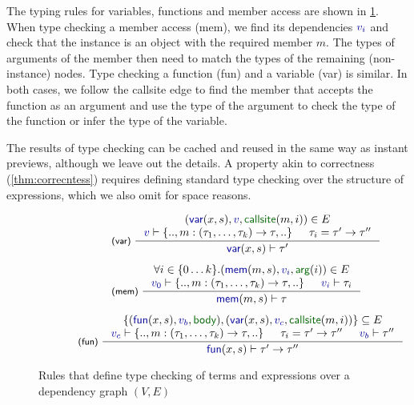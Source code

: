 \documentclass[english,crc,references=cleveref]{programming}
\theoremstyle{plain}
\theoremstyle{definition}
\newcommand{\bndclr}[1]{\textcolor{kvdclr}{#1}}
\newcommand{\bnd}[1]{\textnormal{\textcolor{kvdclr}{\sffamily #1}}}
\newcommand{\blbl}[1]{\textnormal{\textcolor{numclr}{\sffamily #1}}}
\newcommand{\rname}[1]{{\sffamily(#1)}}
\begin{document}
The typing rules for variables, functions and member access are shown in \cref{fig:tc}.
When type checking a member access \rname{mem}, we find its dependencies $\bndclr{v_i}$ and
check that the instance is an object with the required member $m$. The types of arguments of the
member then need to match the types of the remaining (non-instance) nodes.
Type checking a function \rname{fun} and a variable \rname{var} is similar. In both cases,
we follow the \blbl{callsite} edge to find the member that accepts the function as an argument
and use the type of the argument to check the type of the function or infer the type of the
variable.

The results of type checking can be cached and reused in the same way as instant previews, although
we leave out the details. A property akin to correctness (\cref{thm:correcntess})
requires defining standard type checking over the structure of expressions, which we also
omit for space reasons.


\begin{figure}
\begin{equation*}
\hspace{-1em}
\begin{array}{l}
\hspace{7em}\inference[\rname{var}~]
  { (\bnd{var}(x,s), \bndclr{v}, \blbl{callsite}(m, i)) \in E \\
    \bndclr{v} \vdash \{.., m:(\tau_1, \ldots, \tau_k)\rightarrow \tau,..\} & \tau_i=\tau'\rightarrow\tau'' }
  { \bnd{var}(x, s) \vdash \tau' }
\\[1.5em]
\hspace{7em}\inference[\rname{mem}~]
  { \forall i\in\{0\ldots k\}.(\bnd{mem}(m, s), \bndclr{v_i}, \blbl{arg}(i)) \in E \\
  \bndclr{v_0} \vdash \{.., m:(\tau_1, \ldots, \tau_k) \rightarrow \tau, ..\} & \bndclr{v_i} \vdash \tau_i }
  { \bnd{mem}(m, s) \vdash \tau }
\\[1.5em]
\hspace{4em}\inference[\rname{fun}~]
  { \{(\bnd{fun}(x,s), \bndclr{v_b}, \blbl{body}), (\bnd{var}(x,s), \bndclr{v_c}, \blbl{callsite}(m, i))\} \subseteq E \\
    \bndclr{v_c} \vdash \{.., m:(\tau_1, \ldots, \tau_k)\rightarrow \tau,..\} &
    \tau_i=\tau'\rightarrow\tau'' & \bndclr{v_b} \vdash \tau'' }
  { \bnd{fun}(x, s) \vdash \tau' \rightarrow \tau'' }
\end{array}
\end{equation*}
\vspace{-0.5em}
\caption{Rules that define type checking of terms and expressions over a dependency graph $(V, E)$}
\label{fig:tc}
\vspace{-0.5em}
\end{figure}
\end{document}
